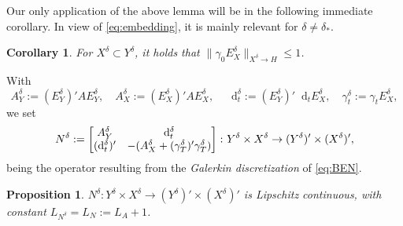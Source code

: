 \documentclass{amsart}
\newtheorem{proposition}[theorem]{Proposition}
\newtheorem{corollary}[theorem]{Corollary}
\numberwithin{equation}{section}
\newcommand{\NN}{N}
\newcommand{\1}{\mathbb 1}
\newcommand*\diff{\mathop{}\!\mathrm{d}}
\begin{document}
Our only application of the above lemma will be in the following immediate corollary. In view of \eqref{eq:embedding}, it is mainly relevant for $\delta \neq \delta_*$.

\begin{corollary} \label{corol:2} 
For $X^\delta \subset Y^\delta$, it holds that $
\|\gamma_0 E_X^\delta\|_{X^\delta \rightarrow H} \leq 1$.
\end{corollary}

With
$$
A_Y^\delta:=(E_Y^\delta)' A E_Y^\delta,\quad
A_X^\delta:=(E_X^\delta)' A E_X^\delta,\quad
\diff_t^\delta:=(E_Y^\delta)' \diff_t E_X^\delta,\quad
\gamma_{t}^\delta:=\gamma_{t} E_X^\delta,
$$
we set
$$
\NN^\delta := \left[\begin{array}{@{}cc@{}} A_Y^\delta & \diff_t^\delta\\ (\diff_t^\delta)'& -(A_X^\delta+(\gamma^\delta_T)' \gamma^\delta_T)\end{array}\right]\colon Y^\delta \times X^\delta \rightarrow (Y^\delta)' \times (X^\delta)',
$$
being the operator resulting from the \emph{Galerkin discretization} of \eqref{eq:BEN}.

\begin{proposition} \label{prop:Lip} $N^\delta\colon Y^\delta \times X^\delta \rightarrow (Y^\delta)' \times (X^\delta)'$ is \emph{Lipschitz continuous}, with constant $L_{\NN^\delta}=L_\NN:=L_A+1$.
\end{proposition}
\end{document}
